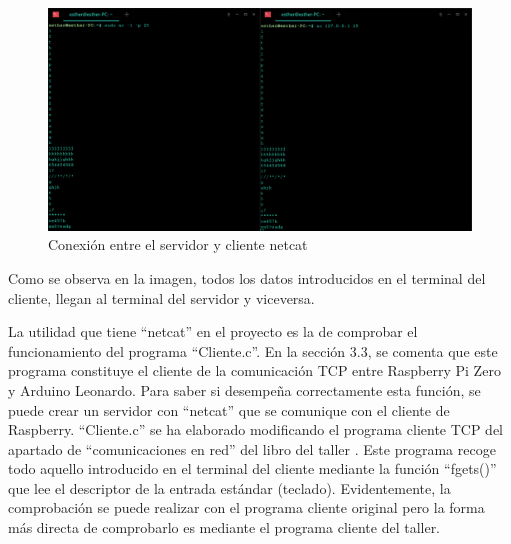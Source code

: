     \begin{figure}
    \centering
    \includegraphics[scale = 0.3]{anexo_b/figuras_dir/csnetcat.jpg}
    \caption{Conexión entre el servidor y cliente netcat}
    \end{figure}
    
Como se observa en la imagen, todos los datos introducidos en el terminal del cliente, llegan al terminal del servidor y viceversa.

La utilidad que tiene ``netcat'' en el proyecto es la de comprobar el funcionamiento del programa ``Cliente.c''. En la sección 3.3, se comenta que este programa constituye el cliente de la comunicación TCP entre Raspberry Pi Zero y Arduino Leonardo. Para saber si desempeña correctamente esta función, se puede crear un servidor con ``netcat'' que se comunique con el cliente de Raspberry. ``Cliente.c'' se ha elaborado modificando el programa cliente TCP del apartado de ``comunicaciones en red'' del libro del taller \citep[pág. 83--85]{tallerRPi}. Este programa recoge todo aquello introducido en el terminal del cliente mediante la función ``fgets()'' que lee el descriptor de la entrada estándar (teclado). Evidentemente, la comprobación se puede realizar con el programa cliente original pero la forma más directa de comprobarlo es mediante el programa cliente del taller.

